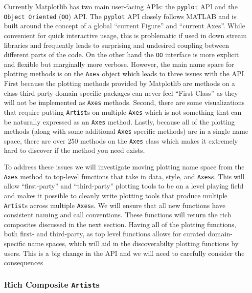 \documentclass[11pt]{article}  %
\begin{document}
Currently Matplotlib has two main user-facing APIs: the
\texttt{pyplot} API and the \texttt{Object Oriented} (\texttt{OO})
API.
The \texttt{pyplot} API closely follows MATLAB and is built around the concept
of a global ``current Figure'' and ``current Axes''.
While
convenient for quick interactive usage, this is
problematic if used in down stream libraries and frequently leads to surprising
and undesired coupling between different parts of the code.
On the other hand the \texttt{OO} interface is more explicit and
flexible but marginally more verbose.
  However, the main name space
for plotting methods is on the \texttt{Axes} object which leads to
three issues with the API.
  First because the plotting methods
provided by Matplotlib are methods on a class third party
domain-specific packages can never feel ``First Class'' as they will
not be implemented as \texttt{Axes} methods.
  Second, there are some
visualizations that require putting \texttt{Artist}s on
multiple \texttt{Axes} which is not something that can be naturally
expressed as an \texttt{Axes} method.
Lastly, because all of the
plotting methods (along with some additional \texttt{Axes} specific
methods) are in a single name space, there are over 250 methods on the
\texttt{Axes} class which makes it extremely hard to discover if the
method you need exists.


To address these issues we will investigate moving plotting name
space from the \texttt{Axes} method to top-level functions that take in
data, style, and \texttt{Axes}s.
This will allow ``first-party'' and
``third-party'' plotting tools to be on a level playing field and
makes it possible to cleanly write plotting tools that produce
multiple \texttt{Artist}s across multiple \texttt{Axes}s.
We will ensure that all new functions have consistent naming and call
conventions.
These
functions will return the rich composites discussed in the next
section.
Having all of the plotting functions, both first- and third-party, as
top level functions allows for curated domain-specific name spaces,
which will aid in the discoverabilty plotting functions by users.
This is a big change in the API and we will need to carefully consider
the consequences

\subsubsection{Rich Composite \texttt{Artist}s}
\end{document}
